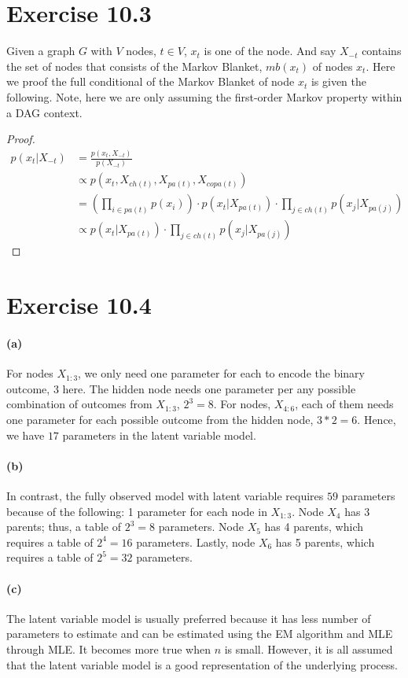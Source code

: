 \documentclass[11pt, letterpaper]{article}
\begin{document}
\section{Exercise 10.3}
Given a graph $G$ with $V$ nodes, $t \in V$, $x_t$ is one of the node. And say $X_{-t}$ contains the set of nodes that consists of the Markov Blanket, $mb(x_t)$ of nodes $x_t$. Here we proof the full conditional of the Markov Blanket of node $x_t$ is given the following. Note, here we are only assuming the first-order Markov property within a DAG context.
\begin{proof}
\begin{align*}
    p(x_t|X_{-t}) &= \frac{p(x_t, X_{-t})}{p(X_{-t})} \\
        &\propto p(x_t, X_{ch(t)}, X_{pa(t)}, X_{copa(t)}) \\
        &= (\prod_{i \in pa(t)} p(x_i)) \cdot p(x_t|X_{pa(t)}) \cdot \prod_{j \in ch(t)} p(x_j|X_{pa(j)}) \\
        &\propto p(x_t|X_{pa(t)}) \cdot \prod_{j \in ch(t)} p(x_j|X_{pa(j)})
\end{align*}
\end{proof}

\section{Exercise 10.4}
\paragraph{(a)}
For nodes $X_{1:3}$, we only need one parameter for each to encode the binary outcome, 3 here. The hidden node needs one parameter per any possible combination of outcomes from $X_{1:3}$, $2^3=8$. For nodes, $X_{4:6}$, each of them needs one parameter for each possible outcome from the hidden node, $3*2=6$. Hence, we have $17$ parameters in the latent variable model.

\paragraph{(b)}
In contrast, the fully observed model with latent variable requires $59$ parameters because of the following: 1 parameter for each node in $X_{1:3}$. Node $X_4$ has 3 parents; thus, a table of $2^3=8$ parameters. Node $X_5$ has 4 parents, which requires a table of $2^4=16$ parameters. Lastly, node $X_6$ has 5 parents, which requires a table of $2^5=32$ parameters.

\paragraph{(c)}
The latent variable model is usually preferred because it has less number of parameters to estimate and can be estimated using the EM algorithm and MLE through MLE. It becomes more true when $n$ is small. However, it is all assumed that the latent variable model is a good representation of the underlying process.
\end{document}
